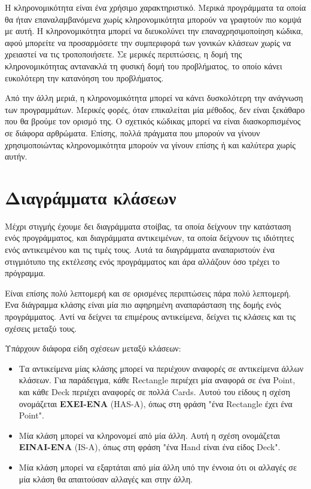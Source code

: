 \documentclass[10pt]{book}
\begin{document}
Η κληρονομικότητα είναι ένα χρήσιμο χαρακτηριστικό. Μερικά προγράμματα τα οποία 
θα ήταν επαναλαμβανόμενα χωρίς κληρονομικότητα μπορούν να γραφτούν πιο κομψά με αυτή.  
Η κληρονομικότητα μπορεί να διευκολύνει την επαναχρησιμοποίηση κώδικα, αφού μπορείτε 
να προσαρμόσετε την συμπεριφορά των γονικών κλάσεων χωρίς να χρειαστεί να τις τροποποιήσετε.
Σε μερικές περιπτώσεις, η δομή της κληρονομικότητας αντανακλά τη φυσική 
δομή του προβλήματος, το οποίο κάνει ευκολότερη την κατανόηση του προβλήματος.

Από την άλλη μεριά, η κληρονομικότητα μπορεί να κάνει δυσκολότερη την ανάγνωση 
των προγραμμάτων. Μερικές φορές, όταν επικαλείται μία μέθοδος, δεν είναι ξεκάθαρο 
που θα βρούμε τον ορισμό της. Ο σχετικός κώδικας μπορεί να είναι διασκορπισμένος 
σε διάφορα αρθρώματα. Επίσης, πολλά πράγματα που μπορούν να γίνουν χρησιμοποιώντας 
κληρονομικότητα μπορούν να γίνουν επίσης ή και καλύτερα χωρίς αυτήν.



\section{Διαγράμματα κλάσεων}
\label{class.diagram}

Μέχρι στιγμής έχουμε δει διαγράμματα στοίβας, τα οποία δείχνουν την κατάσταση 
ενός προγράμματος, και διαγράμματα αντικειμένων, τα οποία δείχνουν τις ιδιότητες 
ενός αντικειμένου και τις τιμές τους.  Αυτά τα διαγράμματα αναπαριστούν ένα στιγμιότυπο 
της εκτέλεσης ενός προγράμματος και άρα αλλάζουν όσο τρέχει το πρόγραμμα.

Είναι επίσης πολύ λεπτομερή και σε ορισμένες περιπτώσεις πάρα πολύ λεπτομερή.  
Ένα διάγραμμα κλάσης είναι μία πιο αφηρημένη αναπαράσταση της δομής ενός προγράμματος.  
Αντί να δείχνει τα επιμέρους αντικείμενα, δείχνει τις κλάσεις και τις σχέσεις μεταξύ τους.

Υπάρχουν διάφορα είδη σχέσεων μεταξύ κλάσεων: 

\begin{itemize}

\item Τα αντικείμενα μίας κλάσης μπορεί να περιέχουν αναφορές σε αντικείμενα άλλων 
κλάσεων.  Για παράδειγμα, κάθε Rectangle περιέχει μία αναφορά σε ένα Point,
και κάθε Deck περιέχει αναφορές σε πολλά Cards. Αυτού του είδους η σχέση ονομάζεται
{\bf ΕΧΕΙ-ΕΝΑ} (HAS-A), όπως στη φράση "ένα Rectangle έχει ένα Point". 

\item Μία κλάση μπορεί να κληρονομεί από μία άλλη.  Αυτή η σχέση ονομάζεται
{\bf ΕΙΝΑΙ-ΕΝΑ} (IS-A), όπως στη φράση "ένα Hand είναι ένα είδος Deck". 

\item Μία κλάση μπορεί να εξαρτάται από μία άλλη υπό την έννοια ότι οι αλλαγές σε 
μία κλάση θα απαιτούσαν αλλαγές και στην άλλη.

\end{itemize}
\end{document}
